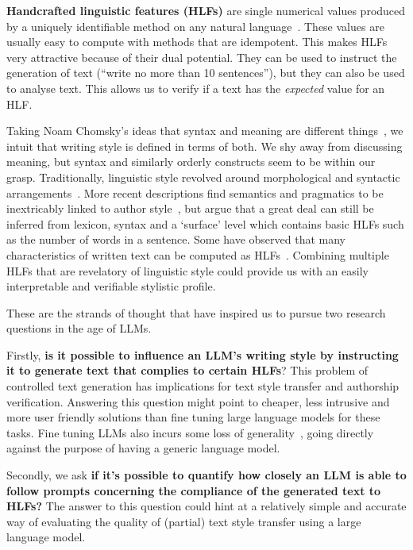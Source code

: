 \documentclass[11pt]{article}
\begin{document}
\textbf{Handcrafted linguistic features (HLFs)} are single numerical values
produced by a uniquely identifiable method on any natural
language~\cite{lftk-2023}.
These values are usually easy to compute with methods that are idempotent.
This makes HLFs very attractive because of their dual potential.
They can be used to instruct the generation of text (``write no more than 10
sentences''), but they can also be used to analyse text.
This allows us to verify if a text has the \textit{expected} value for an HLF.

Taking Noam Chomsky's ideas that syntax and meaning are different
things~\cite{chomsky2002syntactic}, we intuit that writing style is defined in
terms of both.
We shy away from discussing meaning, but syntax and similarly orderly constructs
seem to be within our grasp.
Traditionally, linguistic style revolved around morphological and syntactic
arrangements~\cite{lugea2023stylistics}.
More recent descriptions find semantics and pragmatics to be inextricably linked
to author style~\cite{verma2019lexical}, but argue that a great deal can still
be inferred from lexicon, syntax and a `surface' level which contains basic HLFs
such as the number of words in a sentence.
Some have observed that many characteristics of written text can be computed as
HLFs~\cite{hovy1987generating,lugea2023stylistics}.
Combining multiple HLFs that are revelatory of linguistic style could provide us
with an easily interpretable and verifiable stylistic profile.

These are the strands of thought that have inspired us to pursue two research
questions in the age of LLMs.

Firstly, \textbf{is it possible to influence an LLM's writing style by
    instructing it to generate text that complies to certain HLFs}?
This problem of controlled text generation has implications for text style
transfer and authorship verification.
Answering this question might point to cheaper, less intrusive and more user
friendly solutions than fine tuning large language models for these tasks.
Fine tuning LLMs also incurs some loss of generality~\cite{yang2024unveiling},
going directly against the purpose of having a generic language model.

Secondly, we ask \textbf{if it's possible to quantify how closely an LLM is able
    to follow prompts concerning the compliance of the generated text to HLFs?}
The answer to this question could hint at a relatively simple and accurate way
of evaluating the quality of (partial) text style transfer using a large
language model.
\end{document}
